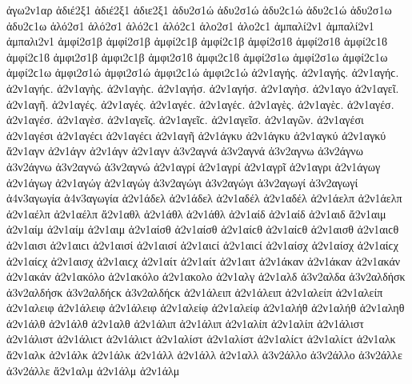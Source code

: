 {ἀγω2ν1αρ
ἀδιέ2ξ1 ἀδιέ2ξ1   %
ἀδιε2ξ1
ἀδυ2σ1ώ ἀδυ2σ1ώ ἀδυ2ϲ1ώ ἀδυ2ϲ1ώ   %
ἀδυ2σ1ω ἀδυ2ϲ1ω
ἁλό2σ1 ἁλό2σ1 ἁλό2ϲ1 ἁλό2ϲ1   %
ἁλο2σ1 ἁλο2ϲ1
ἀμπαλί2ν1 ἀμπαλί2ν1   %
ἀμπαλι2ν1
ἀμφί2σ1β ἀμφί2σ1β ἀμφί2ϲ1β ἀμφί2ϲ1β ἀμφί2σ1ϐ ἀμφί2σ1ϐ ἀμφί2ϲ1ϐ ἀμφί2ϲ1ϐ %
ἀμφι2σ1β ἀμφι2ϲ1β ἀμφι2σ1ϐ ἀμφι2ϲ1ϐ
ἀμφί2σ1ω ἀμφί2σ1ω ἀμφί2ϲ1ω ἀμφί2ϲ1ω   %
ἀμφι2σ1ώ ἀμφι2σ1ώ ἀμφι2ϲ1ώ ἀμφι2ϲ1ώ
ἀ2ν1αγής. ἀ2ν1αγής. ἀ2ν1αγήϲ. ἀ2ν1αγήϲ.   %
ἀ2ν1αγὴς. ἀ2ν1αγὴϲ.
ἀ2ν1αγήσ. ἀ2ν1αγήσ.
ἀ2ν1αγὴσ.
ἀ2ν1αγο
ἀ2ν1αγεῖ.
ἀ2ν1αγῆ.
ἀ2ν1αγές. ἀ2ν1αγές. ἀ2ν1αγέϲ. ἀ2ν1αγέϲ.
ἀ2ν1αγὲς. ἀ2ν1αγὲϲ.
ἀ2ν1αγέσ. ἀ2ν1αγέσ.
ἀ2ν1αγὲσ.
ἀ2ν1αγεῖς. ἀ2ν1αγεῖϲ.
ἀ2ν1αγεῖσ.
ἀ2ν1αγῶν.
ἀ2ν1αγέσι ἀ2ν1αγέσι ἀ2ν1αγέϲι ἀ2ν1αγέϲι
ἀ2ν1αγῆ
ἀ2ν1άγκυ ἀ2ν1άγκυ   %
ἀ2ν1αγκύ ἀ2ν1αγκύ
ἄ2ν1αγν   %
ἀ2ν1άγν ἀ2ν1άγν
ἀ2ν1αγν   %
ἀ3ν2αγνά ἀ3ν2αγνά   %
ἀ3ν2αγνω   %
ἀ3ν2άγνω ἀ3ν2άγνω   %
ἀ3ν2αγνώ ἀ3ν2αγνώ
ἀ2ν1αγρί ἀ2ν1αγρί   %
ἀ2ν1αγρῖ   %
ἀ2ν1αγρι   %
ἀ2ν1άγωγ ἀ2ν1άγωγ   %
ἀ2ν1αγώγ ἀ2ν1αγώγ
ἀ3ν2αγώγι ἀ3ν2αγώγι   %
ἀ3ν2αγωγί ἀ3ν2αγωγί
ἀ4ν3αγωγία ἀ4ν3αγωγία   %
ἀ2ν1άδελ ἀ2ν1άδελ   %
ἀ2ν1αδέλ ἀ2ν1αδέλ
ἀ2ν1άελπ ἀ2ν1άελπ   %
ἀ2ν1αέλπ ἀ2ν1αέλπ
ἄ2ν1αθλ   %
ἀ2ν1άθλ ἀ2ν1άθλ
ἀ2ν1αίδ ἀ2ν1αίδ   %
ἀ2ν1αιδ   %
ἄ2ν1αιμ   %
ἀ2ν1αίμ ἀ2ν1αίμ
ἀ2ν1αιμ   %
ἀ2ν1αίσθ ἀ2ν1αίσθ ἀ2ν1αίϲθ ἀ2ν1αίϲθ   %
ἀ2ν1αισθ ἀ2ν1αιϲθ
ἀ2ν1αισι ἀ2ν1αιϲι   %
ἀ2ν1αισί ἀ2ν1αισί ἀ2ν1αιϲί ἀ2ν1αιϲί
ἀ2ν1αίσχ ἀ2ν1αίσχ ἀ2ν1αίϲχ ἀ2ν1αίϲχ   %
ἀ2ν1αισχ ἀ2ν1αιϲχ
ἀ2ν1αίτ ἀ2ν1αίτ   %
ἀ2ν1αιτ
ἀ2ν1άκαν ἀ2ν1άκαν   %
ἀ2ν1ακάν ἀ2ν1ακάν
ἀ2ν1ακόλο ἀ2ν1ακόλο   %
ἀ2ν1ακολο
ἀ2ν1αλγ   %
ἀ2ν1αλδ   %
ἀ3ν2αλδα   %
ἀ3ν2αλδήσκ ἀ3ν2αλδήσκ ἀ3ν2αλδήϲκ ἀ3ν2αλδήϲκ   %
ἀ2ν1άλειπ ἀ2ν1άλειπ   %
ἀ2ν1αλείπ ἀ2ν1αλείπ
ἀ2ν1αλειφ   %
ἀ2ν1άλειφ ἀ2ν1άλειφ   %
ἀ2ν1αλείφ ἀ2ν1αλείφ
ἀ2ν1αλήθ ἀ2ν1αλήθ   %
ἀ2ν1αληθ
ἀ2ν1άλθ ἀ2ν1άλθ   %
ἀ2ν1αλθ
ἀ2ν1άλιπ ἀ2ν1άλιπ   %
ἀ2ν1αλίπ ἀ2ν1αλίπ
ἀ2ν1άλιστ ἀ2ν1άλιστ ἀ2ν1άλιϲτ ἀ2ν1άλιϲτ   %
ἀ2ν1αλίστ ἀ2ν1αλίστ ἀ2ν1αλίϲτ ἀ2ν1αλίϲτ
ἀ2ν1αλκ   %
ἄ2ν1αλκ   %
ἀ2ν1άλκ ἀ2ν1άλκ
ἀ2ν1άλλ ἀ2ν1άλλ   %
ἀ2ν1αλλ
ἀ3ν2άλλο ἀ3ν2άλλο   %
ἀ3ν2άλλε ἀ3ν2άλλε
ἄ2ν1αλμ   %
ἀ2ν1άλμ ἀ2ν1άλμ   %
}
